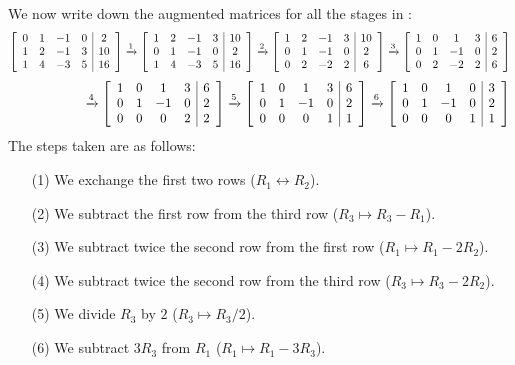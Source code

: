 \documentclass[a4paper]{book}
\theoremstyle{definition}
\begin{document}
We now write down the augmented matrices for all the stages in
:
{\tiny \[
 \left[\begin{array}{cccc|c}
   0 &  1 & -1 &  0 &  2 \\ 
   1 &  2 & -1 &  3 & 10 \\
   1 &  4 & -3 &  5 & 16
 \end{array}\right]
 \xrightarrow{1}
 \left[\begin{array}{cccc|c}
   1 &  2 & -1 &  3 & 10 \\
   0 &  1 & -1 &  0 &  2 \\ 
   1 &  4 & -3 &  5 & 16
 \end{array}\right]
 \xrightarrow{2}
 \left[\begin{array}{cccc|c}
   1 &  2 & -1 &  3 & 10 \\
   0 &  1 & -1 &  0 &  2 \\ 
   0 &  2 & -2 &  2 &  6
 \end{array}\right]
 \xrightarrow{3}
 \left[\begin{array}{cccc|c}
   1 &  0 &  1 &  3 &  6 \\
   0 &  1 & -1 &  0 &  2 \\ 
   0 &  2 & -2 &  2 &  6
 \end{array}\right]
\]
\[ \hspace{6em}
 \xrightarrow{4}
 \left[\begin{array}{cccc|c}
   1 &  0 &  1 &  3 &  6 \\
   0 &  1 & -1 &  0 &  2 \\ 
   0 &  0 &  0 &  2 &  2
 \end{array}\right]
 \xrightarrow{5}
 \left[\begin{array}{cccc|c}
   1 &  0 &  1 &  3 &  6 \\
   0 &  1 & -1 &  0 &  2 \\ 
   0 &  0 &  0 &  1 &  1
 \end{array}\right]
 \xrightarrow{6}
 \left[\begin{array}{cccc|c}
   1 &  0 &  1 &  0 &  3 \\
   0 &  1 & -1 &  0 &  2 \\ 
   0 &  0 &  0 &  1 &  1
 \end{array}\right]
\]}
The steps taken are as follows:
\begin{itemize}
 \item[(1)] We exchange the first two rows
  ($R_1\leftrightarrow R_2$).  
 \item[(2)] We subtract the first row from the third row
  ($R_3\mapsto R_3-R_1$).
 \item[(3)] We subtract twice the second row from the first row 
  ($R_1\mapsto R_1-2R_2$).
 \item[(4)] We subtract twice the second row from the third row 
  ($R_3\mapsto R_3-2R_2$).
 \item[(5)] We divide $R_3$ by $2$ ($R_3\mapsto R_3/2$).
 \item[(6)] We subtract $3R_3$ from $R_1$ ($R_1\mapsto R_1-3R_3$).
\end{itemize}
\end{document}
